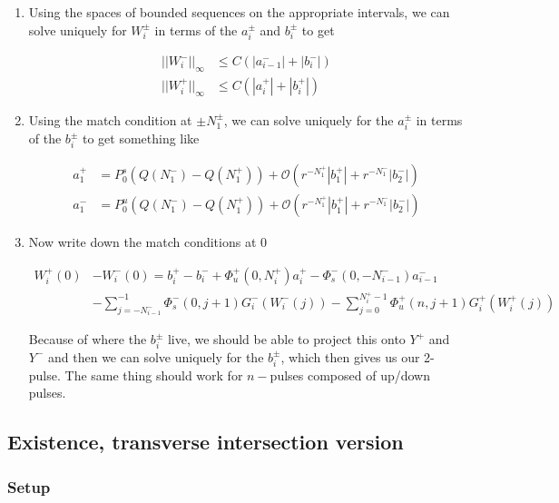 \documentclass[12pt]{article}
\begin{document}
\begin{enumerate}
\item Using the spaces of bounded sequences on the appropriate intervals, we can solve uniquely for $W_i^\pm$ in terms of the $a_i^\pm$ and $b_i^\pm$ to get

\begin{align*}
||W_i^-||_\infty &\leq C (|a_{i-1}^-| + |b_i^-|) \\
||W_i^+||_\infty &\leq C (|a_i^+| + |b_i^+| )
\end{align*}

\item Using the match condition at $\pm N_1^\pm$, we can solve uniquely for the $a_i^\pm$ in terms of the $b_i^\pm$ to get something like

\begin{align*}
a_1^+ &= P^s_0 \left( Q(N_1^-) - Q(N_1^+) \right) 
+ \mathcal{O}( r^{-N_1^+} |b_1^+| + r^{-N_1^-}|b_2^-| )\\
a_1^- &= P^u_0 \left( Q(N_1^-) - Q(N_1^+) \right) 
+ \mathcal{O}( r^{-N_1^+} |b_1^+| + r^{-N_1^-}|b_2^-| )
\end{align*}

\item Now write down the match conditions at 0

\begin{align*}
W_i^+(0) &- W_i^-(0) = b_i^+ - b_i^- + \Phi_u^+(0, N_i^+) a_i^+ - \Phi_s^-(0, -N_{i-1}^-) a_{i-1}^-  \\
&- \sum_{j = -N_{i-1}^-}^{-1} \Phi_s^-(0, j+1) G_i^-(W_i^-(j)) - \sum_{j = 0}^{N_i^+-1} \Phi_u^+(n, j+1) G_i^+(W_i^+(j))
\end{align*}

Because of where the $b_i^\pm$ live, we should be able to project this onto $Y^+$ and $Y^-$ and then we can solve uniquely for the $b_i^\pm$, which then gives us our 2-pulse. The same thing should work for $n-$pulses composed of up/down pulses.

\end{enumerate}

\subsection{Existence, transverse intersection version}

\subsubsection{Setup}
\end{document}
